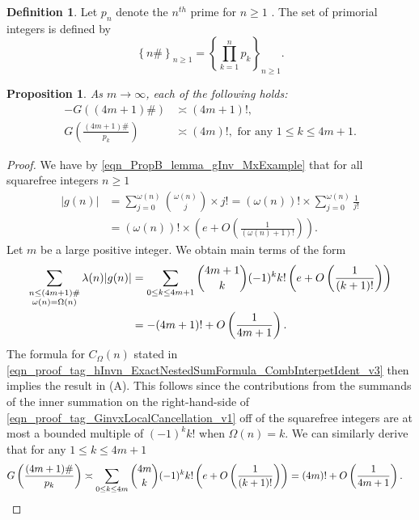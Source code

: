 \documentclass[11pt,reqno,a4letter]{article}
\numberwithin{equation}{section}
\numberwithin{figure}{section}
\numberwithin{table}{section}
\newcommand{\seqnum}[1]{\href{http://oeis.org/#1}{\color{ProcessBlue}{\underline{#1}}}}
\theoremstyle{plain}
\newtheorem{prop}[theorem]{Proposition}
\numberwithin{theorem}{section}
\theoremstyle{definition}
\newtheorem{definition}[theorem]{Definition}
\begin{document}
\begin{definition}
Let $p_n$ denote the $n^{th}$ prime for $n \geq 1$ 
\cite[\seqnum{A000040}]{OEIS}. 
The set of primorial integers is defined by  
\cite[\seqnum{A002110}]{OEIS} 
\[
\left\{n\#\right\}_{n \geq 1} = \left\{\prod_{k=1}^{n} p_k\right\}_{n \geq 1}. 
\]
\end{definition}

\begin{prop}
\label{theorem_PrimorialSeqGInvCalcs_v1} 
As $m \rightarrow \infty$, each of the following holds: 
\begin{align} 
\tag{A} 
-G((4m+1)\#) & \asymp (4m+1)!, \\ 
\tag{B} 
G\left(\frac{(4m+1)\#}{p_k}\right) & \asymp (4m)!, 
     \text{ for any } 1 \leq k \leq 4m+1. 
\end{align} 
\end{prop}
\begin{proof} 
We have by \eqref{eqn_PropB_lemma_gInv_MxExample} 
that for all squarefree integers $n \geq 1$ 
\begin{align*} 
|g(n)| & = \sum_{j=0}^{\omega(n)} \binom{\omega(n)}{j} \times j! 
     = (\omega(n))! \times \sum_{j=0}^{\omega(n)} \frac{1}{j!} \\ 
     & = (\omega(n))! \times \left(e + O\left(\frac{1}{(\omega(n)+1)!}\right)\right). 
\end{align*} 
Let $m$ be a large positive integer. 
We obtain main terms of the form 
\begin{align} 
\label{eqn_proof_tag_GinvxLocalCancellation_v1} 
\sum_{\substack{n \leq (4m+1)\# \\ \omega(n)=\Omega(n)}} \lambda(n) |g(n)| 
     & = \sum_{0 \leq k \leq 4m+1} \binom{4m+1}{k} (-1)^{k} k! 
     \left(e + O\left(\frac{1}{(k+1)!}\right)\right) \\ 
\notag 
     & = -(4m+1)! + O\left(\frac{1}{4m+1}\right). 
\end{align} 
The formula for $C_{\Omega}(n)$ stated in 
\eqref{eqn_proof_tag_hInvn_ExactNestedSumFormula_CombInterpetIdent_v3} 
then implies the result in (A). 
This follows since the contributions from the summands of the inner 
summation on the right-hand-side of 
\eqref{eqn_proof_tag_GinvxLocalCancellation_v1} 
off of the squarefree integers 
are at most a bounded multiple of $(-1)^k k!$ when $\Omega(n) = k$. 
We can similarly derive that for any $1 \leq k \leq 4m+1$ 
\begin{align*}
G\left(\frac{(4m+1)\#}{p_k}\right) & \asymp \sum_{0 \leq k \leq 4m} \binom{4m}{k} (-1)^{k} k! 
     \left(e + O\left(\frac{1}{(k+1)!}\right)\right) = (4m)! + O\left(\frac{1}{4m+1}\right). 
     \qedhere 
\end{align*}
\end{proof}
\end{document}
